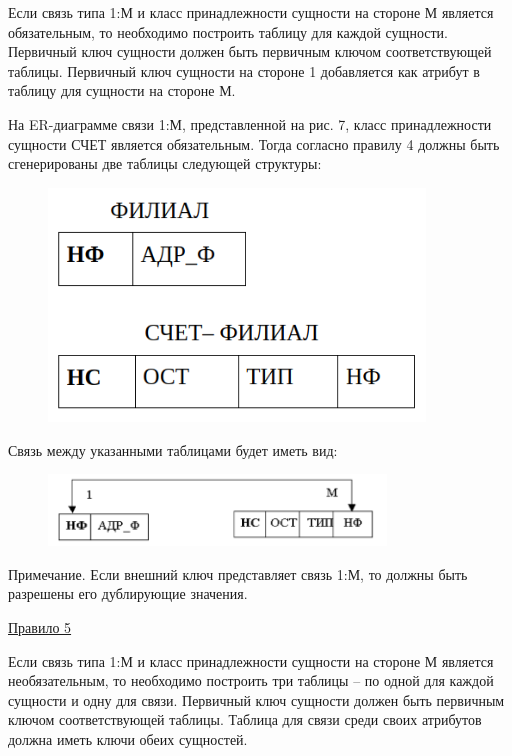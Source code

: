 \begin{enumerate}
    Если связь типа 1:М и класс принадлежности сущности на стороне М является обязательным, то необходимо
    построить таблицу для каждой сущности. Первичный ключ сущности должен быть первичным ключом соответствующей
    таблицы. Первичный ключ сущности на стороне 1 добавляется как атрибут в таблицу для сущности на стороне М.

    На ER-диаграмме связи 1:М, представленной на рис. 7, класс принадлежности сущности СЧЕТ является обязательным.
    Тогда согласно правилу 4 должны быть сгенерированы две таблицы следующей структуры:

    \begin{figure}[H]
        \centering
        \includegraphics[width=100mm]{assets/security/pic9.png}
        \label{fig:mesh11}
    \end{figure}

    Связь между указанными таблицами будет иметь вид:

    \begin{figure}[H]
        \centering
        \includegraphics[width=0.8\textwidth]{assets/security/pic10.png}
        \label{fig:mesh12}
    \end{figure}

    Примечание. Если внешний ключ представляет связь 1:М, то должны быть разрешены его дублирующие значения.

    \underline{Правило 5}

    Если связь типа 1:М и класс принадлежности сущности на стороне М является необязательным,
    то необходимо построить три таблицы – по одной для каждой сущности и одну для связи. Первичный ключ сущности
    должен быть первичным ключом соответствующей таблицы. Таблица для связи среди своих атрибутов должна
    иметь ключи обеих сущностей.


\end{enumerate}

